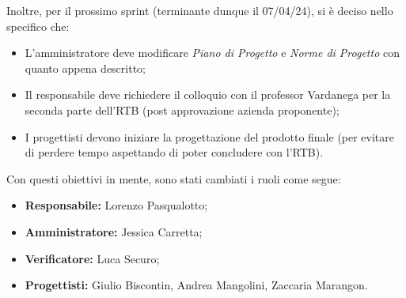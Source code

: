 \noindent Inoltre, per il prossimo sprint (terminante dunque il 07/04/24), si è deciso nello specifico che:
\begin{itemize}
    \item L'amministratore deve modificare \textit{Piano di Progetto} e \textit{Norme di Progetto} con quanto appena descritto;
    \item Il responsabile deve richiedere il colloquio con il professor Vardanega per la seconda parte dell'RTB (post approvazione azienda proponente);
    \item I progettisti devono iniziare la progettazione del prodotto finale (per evitare di perdere tempo aspettando di poter concludere con l'RTB).
\end{itemize}
Con questi obiettivi in mente, sono stati cambiati i ruoli come segue:
\begin{itemize}
    \item \textbf{Responsabile:} Lorenzo Pasqualotto;
    \item \textbf{Amministratore:} Jessica Carretta;
    \item \textbf{Verificatore:} Luca Securo;
    \item \textbf{Progettisti:} Giulio Biscontin, Andrea Mangolini, Zaccaria Marangon.
\end{itemize}